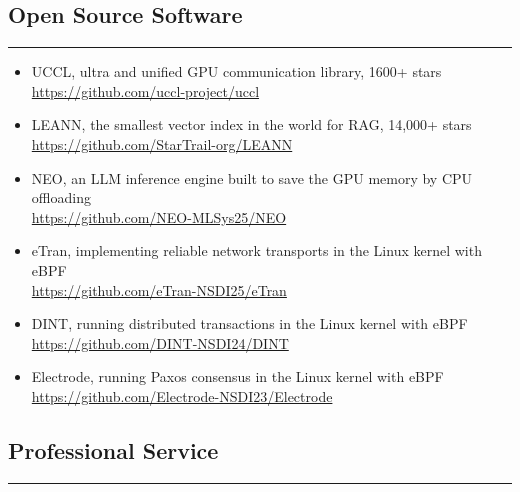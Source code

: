 \documentclass[letterpaper, 11pt]{article}
\newcounter{mySaveCounter}
\newcommand\myEnumReset{\setcounter{mySaveCounter}{0}}
\begin{document}
\subsection*{\sc Open Source Software}
\hrule\vspace{0.2cm}
\begin{itemize}
    \setlength{\itemsep}{0pt}%
    \setlength{\parskip}{2pt}%
    \item UCCL, ultra and unified GPU communication library, 1600+ stars \\
        \href{https://github.com/uccl-project/uccl}{https://github.com/uccl-project/uccl}
    \item LEANN, the smallest vector index in the world for RAG, 14,000+ stars \\
        \href{https://github.com/StarTrail-org/LEANN}{https://github.com/StarTrail-org/LEANN}
    \item NEO, an LLM inference engine built to save the GPU memory by CPU offloading \\
        \href{https://github.com/NEO-MLSys25/NEO}{https://github.com/NEO-MLSys25/NEO}
    \item eTran, implementing reliable network transports in the Linux kernel with eBPF\\
        \href{https://github.com/eTran-NSDI25/eTran}{https://github.com/eTran-NSDI25/eTran}
    \item DINT, running distributed transactions in the Linux kernel with eBPF\\
        \href{https://github.com/DINT-NSDI24/DINT}{https://github.com/DINT-NSDI24/DINT}
    \item Electrode, running Paxos consensus in the Linux kernel with eBPF \\
        \href{https://github.com/Electrode-NSDI23/Electrode}{https://github.com/Electrode-NSDI23/Electrode}
\end{itemize}
\myEnumReset 

\subsection*{\sc Professional Service}
\hrule
\vspace{0.2cm}
\end{document}
